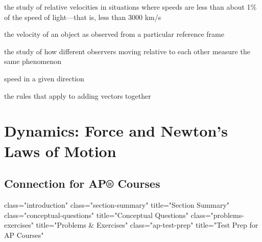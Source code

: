 \documentclass[
]{book}
\providecommand{\tightlist}{%
  \setlength{\itemsep}{0pt}\setlength{\parskip}{0pt}}
\begin{document}
\begin{description}
\tightlist
\item[classical relativity]
the study of relative velocities in situations where speeds are less
than about 1\% of the speed of light---that is, less than 3000 km/s
\end{description}

\begin{description}
\tightlist
\item[relative velocity]
the velocity of an object as observed from a particular reference
frame
\end{description}

\begin{description}
\tightlist
\item[relativity]
the study of how different observers moving relative to each other
measure the same phenomenon
\end{description}

\begin{description}
\tightlist
\item[velocity]
speed in a given direction
\end{description}

\begin{description}
\tightlist
\item[vector addition]
the rules that apply to adding vectors together
\end{description}

\hypertarget{dynamics-force-and-newtons-laws-of-motion}{%
\chapter{Dynamics: Force and Newton's Laws of Motion}\label{dynamics-force-and-newtons-laws-of-motion}}

\hypertarget{connection-for-ap-courses-1}{%
\section{Connection for AP® Courses}\label{connection-for-ap-courses-1}}

class="introduction"
class="section-summary"
title="Section Summary"
class="conceptual-questions"
title="Conceptual Questions"
class="problems-exercises"
title="Problems \& Exercises"
class="ap-test-prep" title="Test
Prep for AP Courses"
\end{document}
